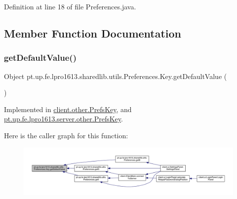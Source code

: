 Definition at line 18 of file Preferences.\+java.



\subsection{Member Function Documentation}
\hypertarget{interfacept_1_1up_1_1fe_1_1lpro1613_1_1sharedlib_1_1utils_1_1_preferences_1_1_key_aa78c759626a4e04578befd149e4c7310}{}\label{interfacept_1_1up_1_1fe_1_1lpro1613_1_1sharedlib_1_1utils_1_1_preferences_1_1_key_aa78c759626a4e04578befd149e4c7310} 
\subsubsection{\texorpdfstring{get\+Default\+Value()}{getDefaultValue()}}
{\footnotesize\ttfamily Object pt.\+up.\+fe.\+lpro1613.\+sharedlib.\+utils.\+Preferences.\+Key.\+get\+Default\+Value (\begin{DoxyParamCaption}{ }\end{DoxyParamCaption})}



Implemented in \hyperlink{enumclient_1_1other_1_1_prefs_key_a7d50bec7ffef68ca2b9657cc4a8b271f}{client.\+other.\+Prefs\+Key}, and \hyperlink{enumpt_1_1up_1_1fe_1_1lpro1613_1_1server_1_1other_1_1_prefs_key_ab8700091048a80f746647cebab8a1876}{pt.\+up.\+fe.\+lpro1613.\+server.\+other.\+Prefs\+Key}.

Here is the caller graph for this function\+:
\nopagebreak
\begin{figure}[H]
\begin{center}
\leavevmode
\includegraphics[width=350pt]{interfacept_1_1up_1_1fe_1_1lpro1613_1_1sharedlib_1_1utils_1_1_preferences_1_1_key_aa78c759626a4e04578befd149e4c7310_icgraph}
\end{center}
\end{figure}
\hypertarget{interfacept_1_1up_1_1fe_1_1lpro1613_1_1sharedlib_1_1utils_1_1_preferences_1_1_key_af244cecb8edad1f87eaaa517c3590507}{}\label{interfacept_1_1up_1_1fe_1_1lpro1613_1_1sharedlib_1_1utils_1_1_preferences_1_1_key_af244cecb8edad1f87eaaa517c3590507} 
